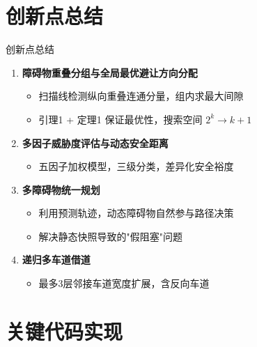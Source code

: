 \documentclass[aspectratio=169,10pt,fontset=none]{ctexbeamer}
\begin{document}
\section{创新点总结}

\begin{frame}{创新点总结}
  \begin{enumerate}
    \item \textbf{障碍物重叠分组与全局最优避让方向分配}
      \begin{itemize}
        \item 扫描线检测纵向重叠连通分量，组内求最大间隙
        \item 引理1 + 定理1 保证最优性，搜索空间 $2^k \to k+1$
      \end{itemize}

    \vspace{0.3cm}
    \item \textbf{多因子威胁度评估与动态安全距离}
      \begin{itemize}
        \item 五因子加权模型，三级分类，差异化安全裕度
      \end{itemize}

    \vspace{0.3cm}
    \item \textbf{多障碍物统一规划}
      \begin{itemize}
        \item 利用预测轨迹，动态障碍物自然参与路径决策
        \item 解决静态快照导致的"假阻塞"问题
      \end{itemize}

    \vspace{0.3cm}
    \item \textbf{递归多车道借道}
      \begin{itemize}
        \item 最多3层邻接车道宽度扩展，含反向车道
      \end{itemize}
  \end{enumerate}
\end{frame}

\section{关键代码实现}
\end{document}
